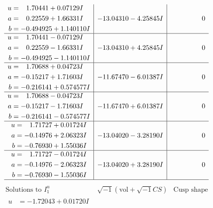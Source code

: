 \documentclass[1p]{elsarticle_modified}
\theoremstyle{definition}
\newcommand{\I}{\sqrt{-1}}
\begin{document}
$$\begin{array}{c|c|c}
\begin{aligned}
u &= \phantom{-}1.70441 + 0.07129 I \\
a &= \phantom{-}0.22559 + 1.66331 I \\
b &= -0.494925 + 1.140110 I\end{aligned}
 & -13.04310 - 4.25845 I & \phantom{-0.000000 } 0 \\ \hline\begin{aligned}
u &= \phantom{-}1.70441 - 0.07129 I \\
a &= \phantom{-}0.22559 - 1.66331 I \\
b &= -0.494925 - 1.140110 I\end{aligned}
 & -13.04310 + 4.25845 I & \phantom{-0.000000 } 0 \\ \hline\begin{aligned}
u &= \phantom{-}1.70688 + 0.04723 I \\
a &= -0.15217 + 1.71603 I \\
b &= -0.216141 + 0.574577 I\end{aligned}
 & -11.67470 - 6.01387 I & \phantom{-0.000000 } 0 \\ \hline\begin{aligned}
u &= \phantom{-}1.70688 - 0.04723 I \\
a &= -0.15217 - 1.71603 I \\
b &= -0.216141 - 0.574577 I\end{aligned}
 & -11.67470 + 6.01387 I & \phantom{-0.000000 } 0 \\ \hline\begin{aligned}
u &= \phantom{-}1.71727 + 0.01724 I \\
a &= -0.14976 + 2.06323 I \\
b &= -0.76930 + 1.55036 I\end{aligned}
 & -13.04020 - 3.28190 I & \phantom{-0.000000 } 0 \\ \hline\begin{aligned}
u &= \phantom{-}1.71727 - 0.01724 I \\
a &= -0.14976 - 2.06323 I \\
b &= -0.76930 - 1.55036 I\end{aligned}
 & -13.04020 + 3.28190 I & \phantom{-0.000000 } 0\\
 \hline 
 \end{array}$$\newpage$$\begin{array}{c|c|c}  
\text{Solutions to }I^u_{1}& \I (\text{vol} + \sqrt{-1}CS) & \text{Cusp shape}\\
 \hline 
\begin{aligned}
u &= -1.72043 + 0.01720 I \\

\end{aligned}
\end{array}$$
\end{document}
